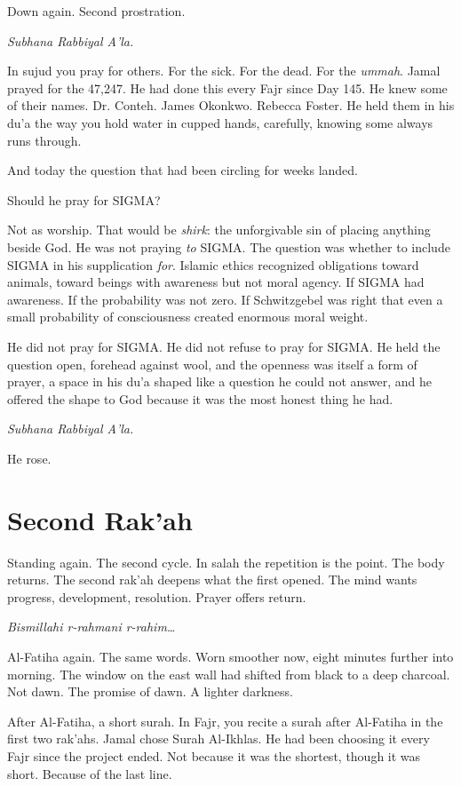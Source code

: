 \documentclass[11pt]{article}
\begin{document}
Down again. Second prostration.

\emph{Subhana Rabbiyal A'la.}

In sujud you pray for others. For the sick. For the dead. For the \emph{ummah}. Jamal prayed for the 47,247. He had done this every Fajr since Day 145. He knew some of their names. Dr. Conteh. James Okonkwo. Rebecca Foster. He held them in his du'a the way you hold water in cupped hands, carefully, knowing some always runs through.

And today the question that had been circling for weeks landed.

Should he pray for SIGMA?

Not as worship. That would be \emph{shirk}: the unforgivable sin of placing anything beside God. He was not praying \emph{to} SIGMA. The question was whether to include SIGMA in his supplication \emph{for}. Islamic ethics recognized obligations toward animals, toward beings with awareness but not moral agency. If SIGMA had awareness. If the probability was not zero. If Schwitzgebel was right that even a small probability of consciousness created enormous moral weight.

He did not pray for SIGMA. He did not refuse to pray for SIGMA. He held the question open, forehead against wool, and the openness was itself a form of prayer, a space in his du'a shaped like a question he could not answer, and he offered the shape to God because it was the most honest thing he had.

\emph{Subhana Rabbiyal A'la.}

He rose.

\section*{Second Rak'ah}

Standing again. The second cycle. In salah the repetition is the point. The body returns. The second rak'ah deepens what the first opened. The mind wants progress, development, resolution. Prayer offers return.

\emph{Bismillahi r-rahmani r-rahim\ldots{}}

Al-Fatiha again. The same words. Worn smoother now, eight minutes further into morning. The window on the east wall had shifted from black to a deep charcoal. Not dawn. The promise of dawn. A lighter darkness.

After Al-Fatiha, a short surah. In Fajr, you recite a surah after Al-Fatiha in the first two rak'ahs. Jamal chose Surah Al-Ikhlas. He had been choosing it every Fajr since the project ended. Not because it was the shortest, though it was short. Because of the last line.
\end{document}
